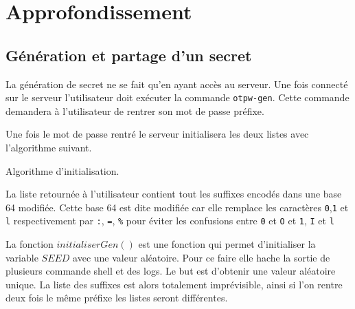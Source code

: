 \documentclass{../res/univ-projet}
\begin{document}
\section{Approfondissement}
\subsection{Génération et partage d'un secret}
        La génération de secret ne se fait qu'en ayant accès au serveur. Une fois
    connecté sur le serveur l'utilisateur doit exécuter la commande \verb?otpw-gen?.
    Cette commande demandera à l'utilisateur de rentrer son mot de passe préfixe.

        Une fois le mot de passe rentré le serveur initialisera les deux listes avec 
    l'algorithme suivant.
    \begin{algorithm}
        \begin{algorithmic}
            \ENDFOR
        \end{algorithmic}
        \caption{Algorithme d'initialisation.}
        \label{gen}
    \end{algorithm}
    
        La liste retournée à l'utilisateur contient tout les suffixes encodés dans une
    base 64 modifiée. Cette base 64 est dite modifiée car elle remplace les caractères
     \verb?0?,\verb?1? et \verb?l? respectivement par \verb?:?, \verb?=?, \verb?%?
     pour éviter les confusions entre \verb?0? et \verb?O? et \verb?1?, \verb?I? et \verb?l?

    La fonction $initialiserGen()$ est une fonction qui permet d'initialiser
    la variable $SEED$ avec une valeur aléatoire. Pour ce faire elle hache la sortie
    de plusieurs commande shell et des logs. Le but est d'obtenir une valeur aléatoire
    unique. La liste des suffixes est alors totalement imprévisible, ainsi si l'on rentre
    deux fois le même préfixe les listes seront différentes.
\end{document}
